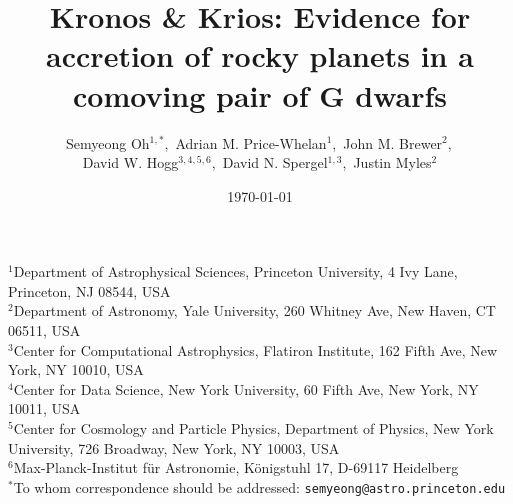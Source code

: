 \documentclass[12pt,letterpaper,margin=1in]{article}
\title{
\vspace{-2cm}
  Kronos \& Krios: Evidence for accretion of rocky planets in a comoving pair of G dwarfs
  \vspace{-0.5cm}
}
\author{
  Semyeong Oh$^{1,*}$,\,
  Adrian M. Price-Whelan$^{1}$,\,
  John M. Brewer$^{2}$,\,\\
  David W. Hogg$^{3,4,5,6}$,\,
  David N. Spergel$^{1,3}$,\,
  Justin Myles$^{2}$
}
\date{\small\today}
\begin{document}
\sloppy\sloppypar\raggedbottom\frenchspacing %
\maketitle

\vspace{-1cm}
{\small\noindent
  $^1$Department of Astrophysical Sciences, Princeton University, 4 Ivy Lane, Princeton, NJ 08544, USA \\
  $^2$Department of Astronomy, Yale University, 260 Whitney Ave, New Haven, CT 06511, USA \\
  $^3$Center for Computational Astrophysics, Flatiron Institute, 162 Fifth Ave, New York, NY 10010, USA \\
  $^4$Center for Data Science, New York University, 60 Fifth Ave, New York, NY 10011, USA \\
  $^5$Center for Cosmology and Particle Physics, Department of Physics, New York University, 726 Broadway, New York, NY 10003, USA \\
  $^6$Max-Planck-Institut f\"ur Astronomie, K\"onigstuhl 17, D-69117 Heidelberg \\
  $^*$To whom correspondence should be addressed: \texttt{semyeong@astro.princeton.edu}
}





\end{document}
